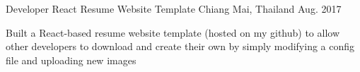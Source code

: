 \begin{cventries}

\cventry
{Developer} %
{React Resume Website Template} %
{Chiang Mai, Thailand} %
{Aug. 2017} %
{ %
\begin{cvitems}
\item {Built a React-based resume website template (hosted on my github) to allow other developers to download and create their own by simply modifying a config file and uploading new images}
\end{cvitems}
}

\end{cventries}